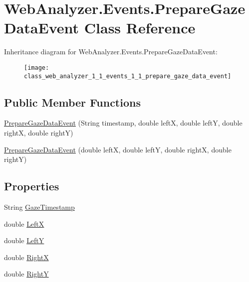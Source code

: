 \hypertarget{class_web_analyzer_1_1_events_1_1_prepare_gaze_data_event}{}\section{Web\+Analyzer.\+Events.\+Prepare\+Gaze\+Data\+Event Class Reference}
\label{class_web_analyzer_1_1_events_1_1_prepare_gaze_data_event}
Inheritance diagram for Web\+Analyzer.\+Events.\+Prepare\+Gaze\+Data\+Event\+:\begin{figure}[H]
\begin{center}
\leavevmode
\texttt{[image: class\_web\_analyzer\_1\_1\_events\_1\_1\_prepare\_gaze\_data\_event]}
\end{center}
\end{figure}
\subsection*{Public Member Functions}
\begin{DoxyCompactItemize}
\item 
\hyperlink{class_web_analyzer_1_1_events_1_1_prepare_gaze_data_event_a4454a93dfb1027db1d538b35c0294d93}{Prepare\+Gaze\+Data\+Event} (String timestamp, double left\+X, double left\+Y, double right\+X, double right\+Y)
\item 
\hyperlink{class_web_analyzer_1_1_events_1_1_prepare_gaze_data_event_a668ee572e96806690256b509f09b6091}{Prepare\+Gaze\+Data\+Event} (double left\+X, double left\+Y, double right\+X, double right\+Y)
\end{DoxyCompactItemize}
\subsection*{Properties}
\begin{DoxyCompactItemize}
\item 
String \hyperlink{class_web_analyzer_1_1_events_1_1_prepare_gaze_data_event_ace28cb2b0e169c973f7c6ffef8aa2901}{Gaze\+Timestamp}
\item 
double \hyperlink{class_web_analyzer_1_1_events_1_1_prepare_gaze_data_event_a9e790efc1d1cd1dccf130c138e8700c4}{Left\+X}
\item 
double \hyperlink{class_web_analyzer_1_1_events_1_1_prepare_gaze_data_event_a60ae4df2f77ec34f2f4b7ae2241e8791}{Left\+Y}
\item 
double \hyperlink{class_web_analyzer_1_1_events_1_1_prepare_gaze_data_event_a680a99afeb211df3bbeb59ba505478c1}{Right\+X}
\item 
double \hyperlink{class_web_analyzer_1_1_events_1_1_prepare_gaze_data_event_a6e215a1ac2257a554a0af8c4adb11096}{Right\+Y}
\end{DoxyCompactItemize}
